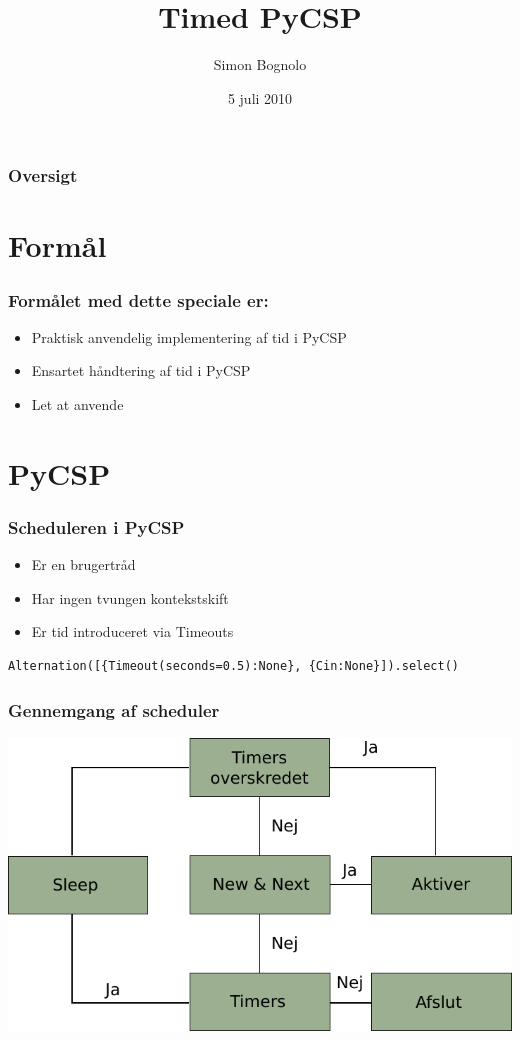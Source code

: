 \documentclass[12pt]{beamer}
\title
{Timed PyCSP}
\institute
{Datalogisk Institut \\ Københavns Universitet}
\author
{Simon Bognolo}
\date
{5 juli 2010}
\begin{document}
\frame[plain]\titlepage
 
\begin{frame}
  \frametitle{Oversigt}
  \tableofcontents
\end{frame}

\section{Formål}
\begin{frame}
  \frametitle{Formålet med dette speciale er:}
  \begin{itemize}
	\item Praktisk anvendelig implementering af tid i PyCSP
	\item Ensartet håndtering af tid i PyCSP
	\item Let at anvende
  \end{itemize}
\end{frame}

 
\section{PyCSP}
\begin{frame} [fragile]
  \frametitle{Scheduleren i PyCSP}
  \begin{itemize}
	\item Er en brugertråd
	\item Har ingen tvungen kontekstskift
	\item Er tid introduceret via Timeouts
  \end{itemize}
\begin{lstlisting}
Alternation([{Timeout(seconds=0.5):None}, {Cin:None}]).select()
\end{lstlisting}
\end{frame}

\begin{frame}
  \frametitle{Gennemgang af scheduler}
  \includegraphics[scale=0.9]{pycsp-scheduler} 
\end{frame}
\end{document}
